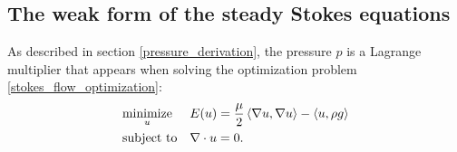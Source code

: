 

\subsection{The weak form of the steady Stokes equations}
As described in section \ref{pressure_derivation}, the pressure $p$ is a Lagrange multiplier that appears
when solving the optimization problem \eqref{stokes_flow_optimization}:
\begin{equation*}
\begin{aligned}
& \underset{u}{\text{minimize}}
& & E(u) =  \frac{\mu}{2} \left<\nabla u, \nabla u\right> - \left<u, \rho g\right>\\
& \text{subject to}
& & \nabla\cdot u = 0.
\end{aligned}
\end{equation*}


